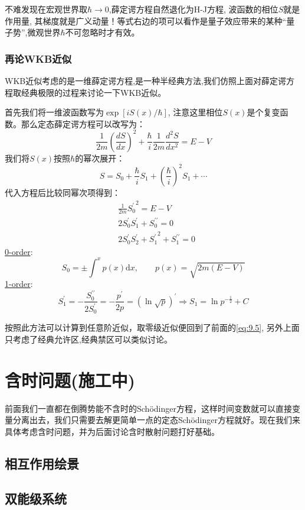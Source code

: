 \documentclass[a4paper,zihao=-4,linespread=1]{ctexrep}
\begin{document}
	不难发现在宏观世界取$\hbar\to 0$,薛定谔方程自然退化为H-J方程, 波函数的相位$S$就是作用量, 其梯度就是广义动量！等式右边的项可以看作是量子效应带来的某种“量子势”,微观世界$\hbar$不可忽略时才有效。
	\subsection*{再论WKB近似}
	WKB近似考虑的是一维薛定谔方程,是一种半经典方法,我们仿照上面对薛定谔方程取经典极限的过程来讨论一下WKB近似。
	
	首先我们将一维波函数写为$\exp\left[iS(x)/\hbar\right]$, 注意这里相位$S(x)$是个复变函数。那么定态薛定谔方程可以改写为：
	\begin{equation}
		\frac{1}{2m}\left(\frac{dS}{dx}\right)^2+\frac{\hbar}{i}\frac{1}{2m}\frac{d^2 S}{dx^2}=E-V
	\end{equation}
	我们将$S(x)$按照$\hbar$的幂次展开：
	\[S=S_0+\frac{\hbar}{i}S_1+\left(\frac{\hbar}{i}\right)^2S_1+\cdots\]
	代入方程后比较同幂次项得到：
	\begin{align}
		&\frac{1}{2m}{S_0^\prime}^2=E-V\\
		&2S_0^\prime S_1^\prime+S_0^{\prime\prime}=0\\
		&2S_0^\prime S_2^\prime+{S_1^\prime}^2+S_1^{\prime\prime}=0
	\end{align}
	\underline{0-order}:\[S_0=\pm\int^xp(x) \mathrm{d}x,\qquad p(x)=\sqrt{2m(E-V)}\]
	\underline{1-order}:\[S^\prime_1=-\frac{S_0^{\prime\prime}}{2S_0^\prime}=-\frac{p^\prime}{2p}=\left(\ln \sqrt{p}\right)^\prime\Rightarrow S_1=\ln p^{-\frac{1}{2}}+C\]
	
	
	按照此方法可以计算到任意阶近似，取零级近似便回到了前面的\ref{eq:9.5}, 另外上面只考虑了经典允许区,经典禁区可以类似讨论。
	\chapter{含时问题(施工中)}
	前面我们一直都在倒腾势能不含时的Sch\"{o}dinger方程，这样时间变数就可以直接变量分离出去，我们只需要去解更简单一点的定态Sch\"{o}dinger方程就好。现在我们来具体考虑含时问题，并为后面讨论含时散射问题打好基础。
	
	\section{相互作用绘景}
	
	\section{双能级系统}
	
\end{document}
